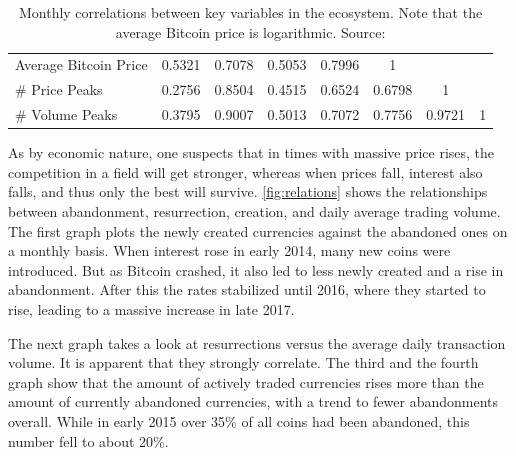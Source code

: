 \documentclass[11pt,a4paper,compsoc,conference]{IEEEtran}
\begin{document}
\begin{table}
{\begin{tabular}{p{2cm}ccccccc@{}}
Average Bitcoin Price & 0.5321                                 & 0.7078                                   & 0.5053                               & 0.7996                           & 1                                                  &                                    &                                     \\
\# Price Peaks                 & 0.2756                                 & 0.8504                                   & 0.4515                               & 0.6524                           & 0.6798                                             & 1                                  &                                     \\
\# Volume Peaks                & 0.3795                                 & 0.9007                                   & 0.5013                               & 0.7072                           & 0.7756                                             & 0.9721                             & 1                                   \\ \bottomrule
\end{tabular}%
}
\caption{Monthly correlations between key variables in the ecosystem. Note that the average Bitcoin price is logarithmic. Source: \citep{Feder2018TheRA} }
\label{tab:my-table3}
\end{table}

As by economic nature, one suspects that in times with massive price rises, the competition in a field will get stronger, whereas when prices fall, interest also falls, and thus only the best will survive. \autoref{fig:relations} shows the relationships between abandonment, resurrection, creation, and daily average trading volume. The first graph plots the newly created currencies against the abandoned ones on a monthly basis. When interest rose in early 2014, many new coins were introduced. But as Bitcoin crashed, it also led to less newly created and a rise in abandonment. After this the rates stabilized until 2016, where they started to rise, leading to a massive increase in late 2017. 

The next graph takes a look at resurrections versus the average daily transaction volume. It is apparent that they strongly correlate. The third and the fourth graph show that the amount of actively traded currencies rises more than the amount of currently abandoned currencies, with a trend to fewer abandonments overall. While in early 2015 over 35\% of all coins had been abandoned, this number fell to about 20\%. 
\end{document}
